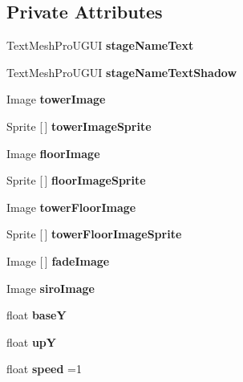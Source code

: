 \subsection*{Private Attributes}
\begin{DoxyCompactItemize}
\item 
\mbox{\label{class_floor_u_i_a13976370b7387496bf8cb27d4ebe7da7}} 
Text\+Mesh\+Pro\+U\+G\+UI {\bfseries stage\+Name\+Text}
\item 
\mbox{\label{class_floor_u_i_a25980f1cc23f0636e1a13e237b713df9}} 
Text\+Mesh\+Pro\+U\+G\+UI {\bfseries stage\+Name\+Text\+Shadow}
\item 
\mbox{\label{class_floor_u_i_a28251f58a3356d00af16271acedab8b9}} 
Image {\bfseries tower\+Image}
\item 
\mbox{\label{class_floor_u_i_a89e5d6f37ef2419a931f93fe49ef9ada}} 
Sprite \mbox{[}$\,$\mbox{]} {\bfseries tower\+Image\+Sprite}
\item 
\mbox{\label{class_floor_u_i_a48b858235596e79de7980105748343b0}} 
Image {\bfseries floor\+Image}
\item 
\mbox{\label{class_floor_u_i_a93ce2e2f47604a1cde22f3203bcbd23f}} 
Sprite \mbox{[}$\,$\mbox{]} {\bfseries floor\+Image\+Sprite}
\item 
\mbox{\label{class_floor_u_i_abf799f858c34a0bb20b0c4623b2a47a7}} 
Image {\bfseries tower\+Floor\+Image}
\item 
\mbox{\label{class_floor_u_i_aa458af158b73bc192f08c20bbbc96182}} 
Sprite \mbox{[}$\,$\mbox{]} {\bfseries tower\+Floor\+Image\+Sprite}
\item 
\mbox{\label{class_floor_u_i_a995ec85c359269c12dbc421e45b0a6b4}} 
Image \mbox{[}$\,$\mbox{]} {\bfseries fade\+Image}
\item 
\mbox{\label{class_floor_u_i_aec20937970bf09709b0e57ddf80df787}} 
Image {\bfseries siro\+Image}
\item 
\mbox{\label{class_floor_u_i_ac4ac56b342877b26b6b5a56eab7ad4f7}} 
float {\bfseries baseY}
\item 
\mbox{\label{class_floor_u_i_a2b172e18aa58c27301df897ef4f94d8d}} 
float {\bfseries upY}
\item 
\mbox{\label{class_floor_u_i_aff3565c1763f62b105e171677d3f18e2}} 
float {\bfseries speed} =1
\end{DoxyCompactItemize}


